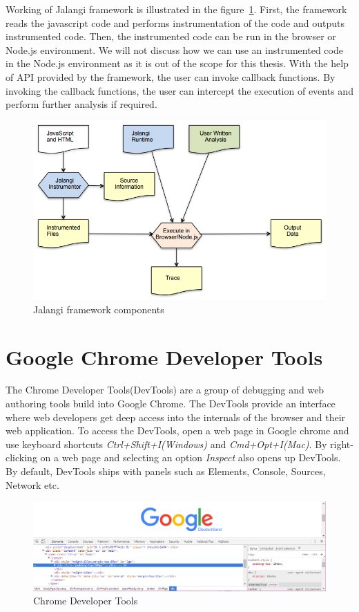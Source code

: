 Working of Jalangi framework is illustrated in the figure~\ref{fig:jalangi-components}. First, the framework reads the javascript code and performs instrumentation of the code and outputs instrumented code. Then, the instrumented code can be run in the browser or Node.js environment. We will not discuss how we can use an instrumented code in the Node.js environment as it is out of the scope for this thesis. With the help of API provided by the framework, the user can invoke callback functions. By invoking the callback functions, the user can intercept the execution of events and perform further analysis if required. 

\begin{figure}[!h]
	\centering
	\includegraphics[scale=0.5,trim=0 0 0 0]{images/jalangi-components.png}
	\caption{Jalangi framework components}
	\label{fig:jalangi-components}
\end{figure}

\section{Google Chrome Developer Tools}
The Chrome Developer Tools(DevTools) are a group of debugging and web authoring tools build into Google Chrome\cite{devtools}. The DevTools provide an interface where web developers get deep access into the internals of the browser and their web application. To access the DevTools, open a web page in Google chrome and use keyboard shortcuts \textit{Ctrl+Shift+I(Windows)} and \textit{Cmd+Opt+I(Mac)}. By right-clicking on a web page and selecting an option \textit{Inspect} also opens up DevTools. By default, DevTools ships with panels such as Elements, Console, Sources, Network etc.

\begin{figure}[!h]
	\centering
	\includegraphics[scale=0.5,trim=0 0 0 0]{images/chrome-devtools.png}
	\caption{Chrome Developer Tools}
	\label{fig:devtools}
\end{figure}

